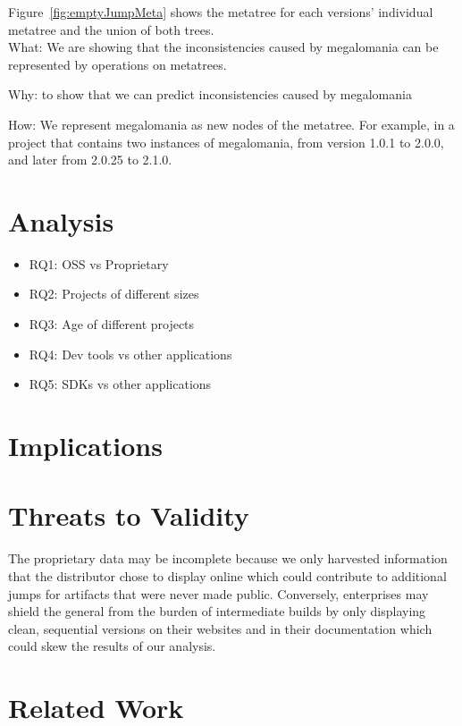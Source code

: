 \documentclass[conference]{IEEEtran}
\begin{document}
Figure~\ref{fig:emptyJumpMeta} shows the metatree for each versions' individual metatree and the union of both trees. \\

What:  We are showing that the inconsistencies caused by megalomania can be represented by operations on metatrees.

Why: to show that we can predict inconsistencies caused by megalomania

How: 
We represent megalomania as new nodes of the metatree.
For example, in a project that contains two instances of megalomania, from version 1.0.1 to 2.0.0, and later from 2.0.25 to 2.1.0.


\section{Analysis}

\begin{itemize}
\item RQ1: OSS vs Proprietary
\item RQ2: Projects of different sizes
\item RQ3: Age of different projects
\item RQ4: Dev tools vs other applications
\item RQ5: SDKs vs other applications 
\end{itemize}


\section{Implications}

\section{Threats to Validity}

 The proprietary data may be incomplete because we only harvested information that the distributor chose to display online which could contribute to additional jumps for artifacts that were never made public. Conversely, enterprises may shield the general from the burden of intermediate builds by only displaying clean, sequential versions on their websites and in their documentation which could skew the results of our analysis.



\section{Related Work}
\end{document}
